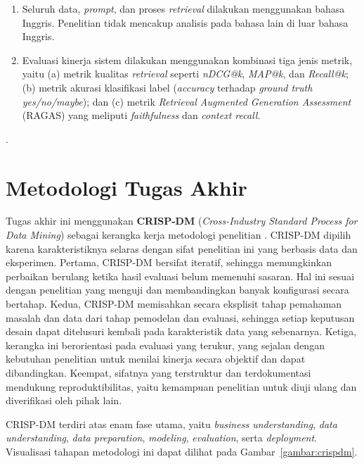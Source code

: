 \begin{enumerate}
    \item Seluruh data,
          \textit{prompt}, dan proses \textit{retrieval} dilakukan
          menggunakan bahasa Inggris. Penelitian tidak mencakup analisis
          pada bahasa lain di luar bahasa Inggris.

    \item Evaluasi kinerja sistem dilakukan
          menggunakan kombinasi tiga jenis metrik, yaitu (a) metrik
          kualitas \textit{retrieval} seperti \textit{nDCG@k},
          \textit{MAP@k}, dan \textit{Recall@k}; (b) metrik akurasi
          klasifikasi label (\textit{accuracy} terhadap \textit{ground
          truth} \textit{yes/no/maybe}); dan (c) metrik \textit{Retrieval
          Augmented Generation Assessment} (RAGAS) yang meliputi
          \textit{faithfulness} dan \textit{context recall}.
\end{enumerate}.

\section{Metodologi Tugas Akhir}

Tugas akhir ini menggunakan \textbf{CRISP-DM} (\textit{Cross-Industry Standard Process for Data Mining}) sebagai kerangka kerja metodologi penelitian \parencite{crispdm_datasciencepm}. CRISP-DM dipilih karena karakteristiknya selaras dengan sifat penelitian ini yang berbasis data dan eksperimen. Pertama, CRISP-DM bersifat iteratif, sehingga memungkinkan perbaikan berulang ketika hasil evaluasi belum memenuhi sasaran. Hal ini sesuai dengan penelitian yang menguji dan membandingkan banyak konfigurasi secara bertahap. Kedua, CRISP-DM memisahkan secara eksplisit tahap pemahaman masalah dan data dari tahap pemodelan dan evaluasi, sehingga setiap keputusan desain dapat ditelusuri kembali pada karakteristik data yang sebenarnya. Ketiga, kerangka ini berorientasi pada evaluasi yang terukur, yang sejalan dengan kebutuhan penelitian untuk menilai kinerja secara objektif dan dapat dibandingkan. Keempat, sifatnya yang terstruktur dan terdokumentasi mendukung reproduktibilitas, yaitu kemampuan penelitian untuk diuji ulang dan diverifikasi oleh pihak lain.

CRISP-DM terdiri atas enam fase utama, yaitu \textit{business understanding}, \textit{data understanding}, \textit{data preparation}, \textit{modeling}, \textit{evaluation}, serta \textit{deployment}. Visualisasi tahapan metodologi ini dapat dilihat pada Gambar~\ref{gambar:crispdm}.

